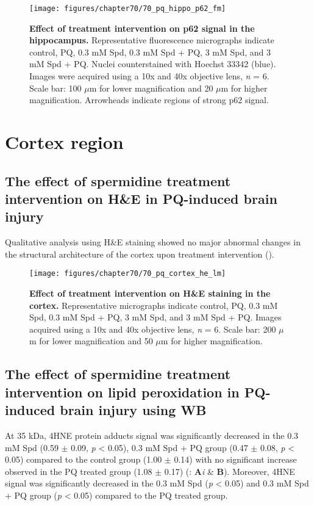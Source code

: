 \begin{landscape}
\begin{figure}[!htbp]
\center
  \texttt{[image: figures/chapter70/70\_pq\_hippo\_p62\_fm]}
  \caption[Effect of treatment intervention on p62 signal in the hippocampus]{\textbf{Effect of treatment intervention on p62 signal in the hippocampus.} Representative fluorescence micrographs indicate control, PQ, 0.3 mM Spd, 0.3 mM Spd + PQ, 3 mM Spd, and 3 mM Spd + PQ. Nuclei counterstained with Hoechst 33342 (blue). Images were acquired using a 10x and 40x objective lens, \textit{n} = 6. Scale bar: 100 $\mu$m for lower magnification and 20 $\mu$m for higher magnification. Arrowheads indicate regions of strong p62 signal.}
  \label{fig:70_pq_hippo_p62_fm}
\end{figure} 
\end{landscape}

\section{Cortex region}
\subsection{The effect of spermidine treatment intervention on H\&E in PQ-induced brain injury}
Qualitative analysis using H\&E staining showed no major abnormal changes in the structural architecture of the cortex upon treatment intervention ().

\begin{figure}[!htbp]
\center
  \texttt{[image: figures/chapter70/70\_pq\_cortex\_he\_lm]}
  \caption[Effect of treatment intervention on H\&E staining in the cortex]{\textbf{Effect of treatment intervention on H\&E staining in the cortex.} Representative micrographs indicate control, PQ, 0.3 mM Spd, 0.3 mM Spd + PQ, 3 mM Spd, and 3 mM Spd + PQ. Images acquired using a 10x and 40x objective lens, \textit{n} = 6. Scale bar: 200 $\mu$m for lower magnification and 50 $\mu$m for higher magnification.}
  \label{fig:70_pq_cortex_he_lm}
\end{figure} 

\subsection{The effect of spermidine treatment intervention on lipid peroxidation in PQ-induced brain injury using WB}
At 35 kDa, 4HNE protein adducts signal was significantly decreased in the 0.3 mM Spd (0.59 $\pm$ 0.09, \textit{p} < 0.05), 0.3 mM Spd + PQ group (0.47 $\pm$ 0.08, \textit{p} < 0.05) compared to the control group (1.00 $\pm$ 0.14) with no significant increase observed in the PQ treated group (1.08 $\pm$ 0.17) (: \textbf{A}\textit{i} \& \textbf{B}). Moreover, 4HNE signal was significantly decreased in the 0.3 mM Spd (\textit{p} < 0.05) and 0.3 mM Spd + PQ group (\textit{p} < 0.05) compared to the PQ treated group. 

